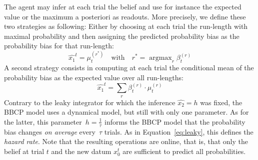 \documentclass[12pt,english]{article}%
\newcommand{\eql}[1]{\begin{equation}#1\end{equation}}
\DeclareMathOperator{\argmax}{argmax}
\newcommand{\seeEq}[1]{Equation~\ref{eq:#1}}
\begin{document}
The agent may infer at each trial the belief
and use for instance the expected value or the maximum a posteriori as readouts.
More precisely, we define these two strategies as following:
Either by choosing
at each trial the run-length with maximal probability
and then assigning the predicted probability bias
as the probability bias for that run-length:
\eql{
\hat{x_1}^t = \mu^{(r^\ast)}_{t} \quad \text{with} \quad r^\ast = \argmax_r \beta^{(r)}_{t}
}
A second strategy consists in computing
at each trial the conditional mean of the probability bias
as the expected value over all run-lengths:
\eql{
\hat{x_1}^t = \sum_{r} \beta^{(r)}_{t} \cdot \mu^{(r)}_{t}
}
Contrary to the leaky integrator for which the inference $\hat{x_2}=h$ was fixed,
the BBCP model uses a dynamical model, but still with only one parameter.
As for the latter, this parameter~$h=\frac 1 \tau$ informs the BBCP model
that the probability bias  changes \emph{on average} every~$\tau$ trials.
As in \seeEq{leaky}, this defines the \emph{hazard rate}.
Note that the resulting operations are online, that is,
that only the belief at trial $t$ and the new datum $x_0^t$
are sufficient to predict all probabilities.
\end{document}
